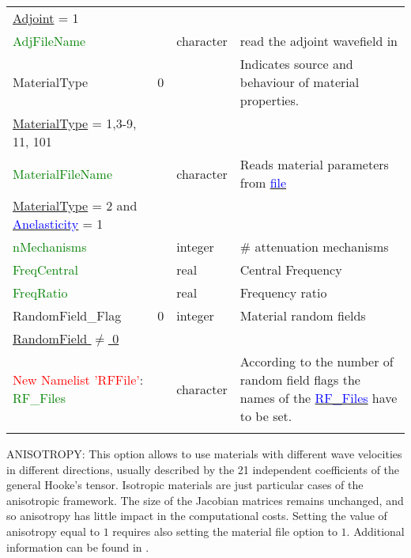 \documentclass[12pt,twoside]{article}
\begin{document}
\begin{longtable}{|p{3cm}|p{2.4cm}|p{2cm}|p{5cm}|}
\uline{Adjoint} = 1 & & &\\
\textcolor{green}{AdjFileName} & & character & read the adjoint wavefield in\\
\hline
MaterialType & 0 & & Indicates source and behaviour of material properties.\\
\hdashline
\uline{MaterialType} = 1,3-9, 11, 101 & & &\\
\textcolor{green}{MaterialFileName} & & character & Reads material parameters from \hyperlink{material}{\textcolor{blue}{file}}\\
\hdashline
\uline{MaterialType} = 2 and \uline{\hyperlink{anelas}{\textcolor{blue}{Anelasticity}}} = 1 & & &\\
\textcolor{green}{nMechanisms} & & integer & \# attenuation mechanisms\\
\textcolor{green}{FreqCentral} & & real & Central Frequency \\
\textcolor{green}{FreqRatio} & & real & Frequency ratio \\
\hline
RandomField\_Flag & 0 & integer & Material random fields\\
\hdashline
\uline{RandomField $\neq$ 0} & & &\\
\textcolor{red}{New Namelist 'RFFile'}: \textcolor{green}{RF\_Files} & & character & According to the number of random field flags the names of the
\hyperlink{random_field}{\textcolor{blue}{RF\_Files}} have to be set.\\
\hline
\label{eq-table}
\end{longtable}

\noindent
\hypertarget{aniso}{ANISOTROPY}: This option allows to use materials with different wave velocities in different directions,
usually described by the 21 independent coefficients of the general Hooke's tensor.
Isotropic materials are just particular cases of the anisotropic framework.
The size of the Jacobian matrices remains unchanged, and so anisotropy has little impact in the computational costs.
Setting the value of anisotropy equal to $1$ requires also setting the material file option to $1$.
Additional information can be found in \cite{PuenteKaeserDumbserIgel07}.\\
\end{document}
